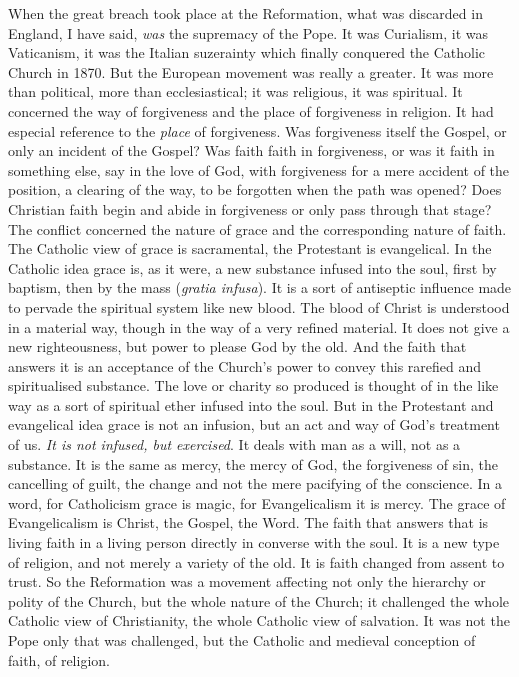 \documentclass[12pt,a5paper,twoside]{book}
\begin{document}
When the great breach took place at the Reformation, 
what was discarded in England, I have said, 
\textit{was} the supremacy of the Pope. It was Curialism, 
it was Vaticanism, it was the Italian suzerainty 
which finally conquered the Catholic Church in 
1870. But the European movement was really a 
greater. It was more than political, more than 
ecclesiastical; it was religious, it was spiritual. It 
concerned the way of forgiveness and the place of 
forgiveness in religion. It had especial reference to 
the \textit{place} of forgiveness. Was forgiveness itself the 
Gospel, or only an incident of the Gospel? Was 
faith faith in forgiveness, or was it faith in something 
else, say in the love of God, with forgiveness for a 
mere accident of the position, a clearing of the way, 
to be forgotten when the path was opened? Does 
Christian faith begin and abide in forgiveness or only 
pass through that stage? The conflict concerned the 
nature of grace and the corresponding nature of faith. 
The Catholic view of grace is sacramental, the Protestant 
is evangelical. In the Catholic idea grace is, 
as it were, a new substance infused into the soul, 
first by baptism, then by the mass (\textit{gratia infusa}). 
It is a sort of antiseptic influence made to pervade 
the spiritual system like new blood. The blood of 
Christ is understood in a material way, though in the 
way of a very refined material. It does not give a 
new righteousness, but power to please God by the 
old. And the faith that answers it is an acceptance 
of the Church's power to convey this rarefied and 
spiritualised substance. The love or charity so produced 
is thought of in the like way as a sort of 
spiritual ether infused into the soul. But in the 
Protestant and evangelical idea grace is not an infusion, 
but an act and way of God's treatment of us. 
\textit{It is not infused, but exercised}. It deals with man 
as a will, not as a substance. It is the same as 
mercy, the mercy of God, the forgiveness of sin, 
the cancelling of guilt, the change and not the mere 
pacifying of the conscience. In a word, for Catholicism 
grace is magic, for Evangelicalism it is mercy. 
The grace of Evangelicalism is Christ, the Gospel, 
the Word. The faith that answers that is living 
faith in a living person directly in converse with 
the soul. It is a new type of religion, and not 
merely a variety of the old. It is faith changed 
from assent to trust. So the Reformation was a 
movement affecting not only the hierarchy or polity 
of the Church, but the whole nature of the Church; 
it challenged the whole Catholic view of Christianity, 
the whole Catholic view of salvation. It was not the 
Pope only that was challenged, but the Catholic and 
medieval conception of faith, of religion. 
\end{document}
